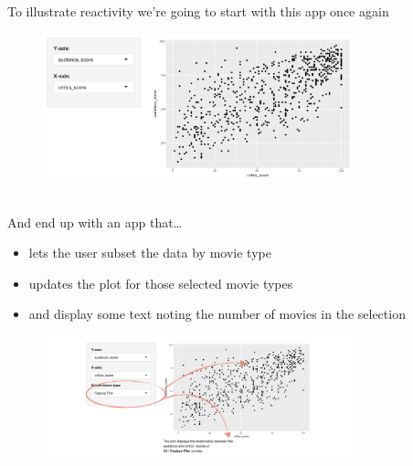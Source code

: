 \documentclass[
  letterpaper,
  DIV=11,
  numbers=noendperiod]{scrreprt}
\providecommand{\tightlist}{%
  \setlength{\itemsep}{0pt}\setlength{\parskip}{0pt}}
\begin{document}
\hypertarget{section-45}{%
\subsection{}\label{section-45}}

To illustrate reactivity we're going to start with this app once again

\begin{figure}

{\centering \includegraphics[width=0.8\textwidth,height=\textheight]{./images/app-selectinput-scatterplot.png}

}

\end{figure}

\hypertarget{section-46}{%
\subsection{}\label{section-46}}

And end up with an app that\ldots{}

\begin{itemize}
\tightlist
\item
  lets the user subset the data by movie type
\item
  updates the plot for those selected movie types
\item
  and display some text noting the number of movies in the selection
\end{itemize}

\begin{figure}

{\centering \includegraphics[width=0.8\textwidth,height=\textheight]{./images/app-scatterplot-text.png}

}

\end{figure}
\end{document}
